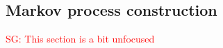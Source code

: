 \documentclass[review]{elsarticle}
\newcommand{\afs}[2]{\Phi_{#1}^{(#2)}}
\newcommand{\Dfrac}[2]{%
  \ooalign{%
    $\genfrac{}{}{1.2pt}0{#1}{#2}$\cr%
    $\color{white}\genfrac{}{}{.4pt}0{\phantom{#1}}{\phantom{#2}}$}%
}
\newcommand{\cond}{\middle\vert}
\newcommand{\sgcomment}[1]{\textcolor{red}{SG: #1}}
\newcommand{\ikcomment}[1]{\textcolor{blue}{IK: #1}}
\begin{document}
 




\subsection{Markov process construction}
\label{subsec:markov}
\sgcomment{This section is a bit unfocused}
%
%
%
%
%
%
\end{document}
